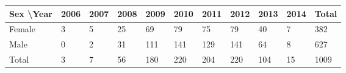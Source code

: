 \begin{center}
\begin{tabular}{l|lllllllll|l}
Sex \textbackslash Year & 2006 & 2007 & 2008 & 2009 & 2010 & 2011 & 2012 & 2013 & 2014 & Total \\ \hline
Female                  & 3   & 5   & 25  & 69  & 79  & 75  & 79   & 40   & 7    & 382   \\
Male                    & 0   & 2  & 31  & 111  & 141  & 129  & 141  & 64   & 8    & 627  \\ \hline
Total                   & 3  & 7  & 56  & 180  & 220  & 204  & 220  & 104  & 15   & 1009 
\end{tabular}
\end{center}